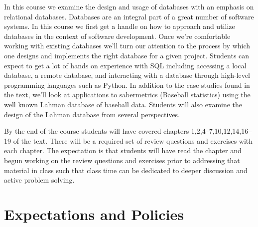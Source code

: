 \documentclass[10pt]{article}
\begin{document}
In this course we examine the design and usage of databases with an emphasis on relational databases. Databases are an integral part of a great number of software systems. In this course we first get a handle on how to approach and utilize databases in the context of software development. Once we're comfortable working with existing databases we'll turn our attention to the process by which one designs and implements the right database for a given project. Students can expect to get a lot of hands on experience with SQL including accessing a local database, a remote database, and interacting with a database through high-level programming languages such as Python.  In addition to the case studies found in the text, we'll look at applications to sabermetrics (Baseball statistics) using the well known Lahman database of baseball data. Students will also examine the design of the Lahman database from several perspectives.

By the end of the course students will have covered chapters 1,2,4--7,10,12,14,16--19 of the text.  There will be a required set of review questions and exercises with each chapter. The expectation is that students will have read the chapter and begun working on the review questions and exercises prior to addressing that material in class such that class time can be dedicated to deeper discussion and active problem solving.


\section{Expectations and Policies}
\end{document}
